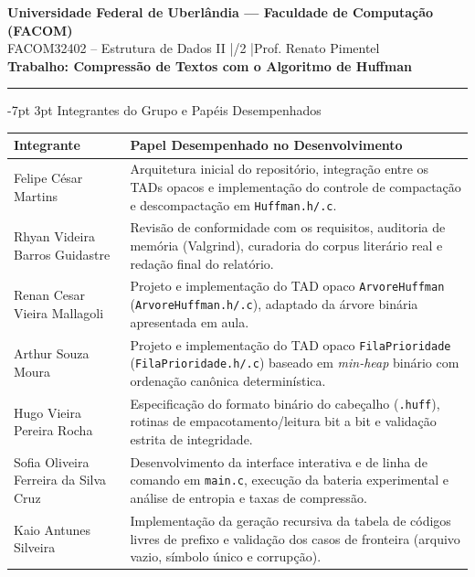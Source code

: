 \documentclass[a4paper,10pt]{article}
\makeatletter
\renewcommand\section{\@startsection {section}{1}{\z@}%
                                   {-7pt \@plus -2pt \@minus -1pt}%
                                   {3pt \@plus 1pt}%
                                   {\normalfont\large\bfseries}}
\makeatother
\begin{document}
\begin{center}
  {\large\bfseries Universidade Federal de Uberlândia --- Faculdade de Computação (FACOM)}\\[2pt]
  {\normalsize FACOM32402 -- Estrutura de Dados II \quad|/2 \quad|\quad Prof. Renato Pimentel}\\[4pt]
  {\Large\bfseries Trabalho: Compressão de Textos com o Algoritmo de Huffman}
\end{center}
\vspace{-5pt}
\hrule
\vspace{4pt}

\section{Integrantes do Grupo e Papéis Desempenhados}
\begin{table}[h!]
\centering
\small
\begin{tabularx}{\textwidth}{|p{5.4cm}|X|}
\hline
\textbf{Integrante} & \textbf{Papel Desempenhado no Desenvolvimento} \\
\hline
Felipe César Martins & Arquitetura inicial do repositório, integração entre os TADs opacos e implementação do controle de compactação e descompactação em \texttt{Huffman.h/.c}. \\
\hline
Rhyan Videira Barros Guidastre & Revisão de conformidade com os requisitos, auditoria de memória (Valgrind), curadoria do corpus literário real e redação final do relatório. \\
\hline
Renan Cesar Vieira Mallagoli & Projeto e implementação do TAD opaco \texttt{ArvoreHuffman} (\texttt{ArvoreHuffman.h/.c}), adaptado da árvore binária apresentada em aula. \\
\hline
Arthur Souza Moura & Projeto e implementação do TAD opaco \texttt{FilaPrioridade} (\texttt{FilaPrioridade.h/.c}) baseado em \emph{min-heap} binário com ordenação canônica determinística. \\
\hline
Hugo Vieira Pereira Rocha & Especificação do formato binário do cabeçalho (\texttt{.huff}), rotinas de empacotamento/leitura bit a bit e validação estrita de integridade. \\
\hline
Sofia Oliveira Ferreira da Silva Cruz & Desenvolvimento da interface interativa e de linha de comando em \texttt{main.c}, execução da bateria experimental e análise de entropia e taxas de compressão. \\
\hline
Kaio Antunes Silveira & Implementação da geração recursiva da tabela de códigos livres de prefixo e validação dos casos de fronteira (arquivo vazio, símbolo único e corrupção). \\
\hline
\end{tabularx}
\end{table}
\vspace{-2pt}
\end{document}

